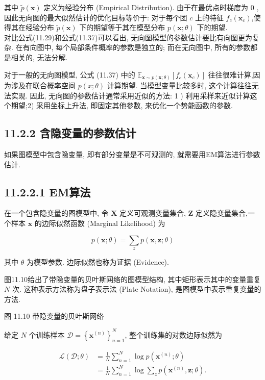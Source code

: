 \documentclass[10pt]{article}
\begin{document}
其中 $\tilde{p}(\boldsymbol{x})$ 定义为经验分布 (Empirical Distribution). 由于在最优点时梯度为 0 , 因此无向图的最大似然估计的优化目标等价于: 对于每个团 $c$ 上的特征 $f_{c}\left(\boldsymbol{x}_{c}\right)$,使得其在经验分布 $\tilde{p}(\boldsymbol{x})$ 下的期望等于其在模型分布 $p(\boldsymbol{x} ; \theta)$ 下的期望.\\
对比公式(11.29)和公式(11.37)可以看出, 无向图模型的参数估计要比有向图更为复杂. 在有向图中, 每个局部条件概率的参数是独立的; 而在无向图中, 所有的参数都是相关的, 无法分解.

对于一般的无向图模型, 公式 (11.37) 中的 $\mathbb{E}_{\boldsymbol{x} \sim p(\boldsymbol{x} ; \theta)}\left[f_{\mathcal{c}}\left(\boldsymbol{x}_{c}\right)\right]$ 往往很难计算,因为涉及在联合概率空间 $p(x ; \theta)$ 计算期望. 当模型变量比较多时, 这个计算往往无法实现. 因此, 无向图的参数估计通常采用近似的方法: 1 ) 利用采样来近似计算这个期望;2) 采用坐标上升法, 即固定其他参数, 来优化一个势能函数的参数.

\subsection*{11.2.2 含隐变量的参数估计}
如果图模型中包含隐变量, 即有部分变量是不可观测的, 就需要用EM算法进行参数估计.

\subsection*{11.2.2.1 EM算法}
在一个包含隐变量的图模型中, 令 $\boldsymbol{X}$ 定义可观测变量集合, $\boldsymbol{Z}$ 定义隐变量集合,一个样本 $\boldsymbol{x}$ 的边际似然函数 (Marginal Likelihood) 为


\begin{equation*}
p(\boldsymbol{x} ; \theta)=\sum_{z} p(\boldsymbol{x}, \boldsymbol{z} ; \theta) \tag{11.38}
\end{equation*}


其中 $\theta$ 为模型参数. 边际似然也称为证据 (Evidence).

图11.10给出了带隐变量的贝叶斯网络的图模型结构, 其中矩形表示其中的变量重复 $N$ 次. 这种表示方法称为盘子表示法 (Plate Notation), 是图模型中表示重复变量的方法.



图 11.10 带隐变量的贝叶斯网络

给定 $N$ 个训练样本 $\mathcal{D}=\left\{\boldsymbol{x}^{(n)}\right\}_{n=1}^{N}$, 整个训练集的对数边际似然为


\begin{align*}
\mathcal{L}(\mathcal{D} ; \theta) & =\frac{1}{N} \sum_{n=1}^{N} \log p\left(\boldsymbol{x}^{(n)} ; \theta\right)  \tag{11.39}\\
& =\frac{1}{N} \sum_{n=1}^{N} \log \sum_{z} p\left(\boldsymbol{x}^{(n)}, \boldsymbol{z} ; \theta\right) . \tag{11.40}
\end{align*}
\end{document}
